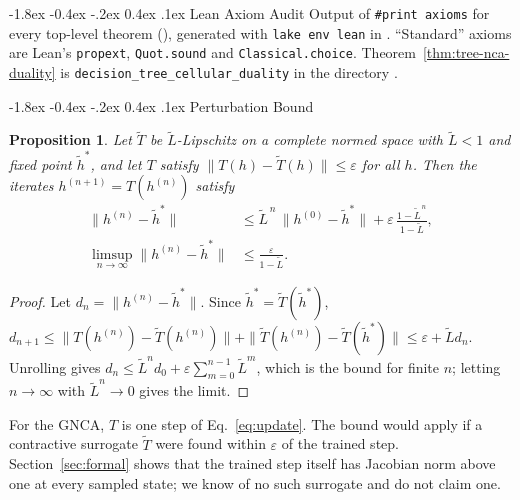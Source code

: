 \documentclass[10pt,twocolumn,letterpaper]{article}
\makeatletter
\renewcommand\section{\@startsection {section}{1}{\z@}%
  {-1.8ex \@plus -0.4ex \@minus -.2ex}%
  {0.4ex \@plus.1ex}%
  {\normalfont\normalsize\bfseries}}
\newtheorem{proposition}{Proposition}
\makeatother
\begin{document}
\appendix
\section{Lean Axiom Audit}\label{app:lean}
Output of \texttt{\#print axioms} for every top-level theorem (), generated with \texttt{lake env lean} in . ``Standard'' axioms are Lean's \texttt{propext}, \texttt{Quot.sound} and \texttt{Classical.choice}.
{\scriptsize
}
Theorem~\ref{thm:tree-nca-duality} is \texttt{decision\_tree\_cellular\_duality} in the directory .

\section{Perturbation Bound}\label{app:ostrowski}
\begin{proposition}\label{prop:perturbation}
Let $\tilde T$ be $\tilde L$-Lipschitz on a complete normed space with $\tilde L<1$ and fixed point $\tilde h^\ast$, and let $T$ satisfy $\|T(h)-\tilde T(h)\|\le\varepsilon$ for all $h$. Then the iterates $h^{(n+1)} = T(h^{(n)})$ satisfy
\begin{align*}
\|h^{(n)}-\tilde h^\ast\| &\le \tilde L^{\,n}\,\|h^{(0)}-\tilde h^\ast\| + \varepsilon\,\frac{1-\tilde L^{\,n}}{1-\tilde L},\\
\limsup_{n\to\infty}\|h^{(n)}-\tilde h^\ast\| &\le \frac{\varepsilon}{1-\tilde L}.
\end{align*}
\end{proposition}
\begin{proof}
Let $d_n = \|h^{(n)}-\tilde h^\ast\|$. Since $\tilde h^\ast = \tilde T(\tilde h^\ast)$,
$d_{n+1} \le \|T(h^{(n)}) - \tilde T(h^{(n)})\| + \|\tilde T(h^{(n)}) - \tilde T(\tilde h^\ast)\| \le \varepsilon + \tilde L d_n$.
Unrolling gives $d_n \le \tilde L^n d_0 + \varepsilon\sum_{m=0}^{n-1}\tilde L^m$, which is the bound for finite $n$; letting $n\to\infty$ with $\tilde L^n\to0$ gives the limit.
\end{proof}
For the GNCA, $T$ is one step of Eq.~\eqref{eq:update}. The bound would apply if a contractive surrogate $\tilde T$ were found within $\varepsilon$ of the trained step. Section~\ref{sec:formal} shows that the trained step itself has Jacobian norm above one at every sampled state; we know of no such surrogate and do not claim one.
\end{document}

